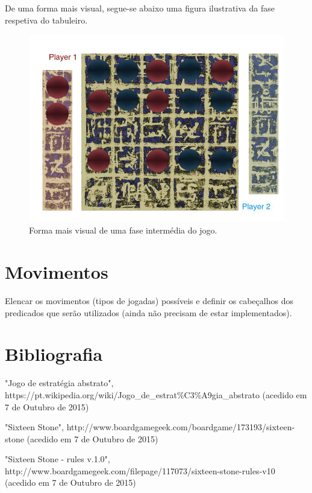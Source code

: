 \documentclass[a4paper]{article}
\begin{document}
De uma forma mais visual, segue-se abaixo uma figura ilustrativa da fase respetiva do tabuleiro.

\begin{figure}[!htb]
	\centering
	\includegraphics[scale=0.6]{images/board_inter.png}
	\caption{Forma mais visual de uma fase intermédia do jogo.}
\end{figure}

\newpage

\section{Movimentos}

Elencar os movimentos (tipos de jogadas) possíveis e definir os cabeçalhos dos predicados que serão utilizados (ainda não precisam de estar implementados).

\newpage

\section*{Bibliografia}

"Jogo de estratégia abstrato", https://pt.wikipedia.org/wiki/Jogo\_de\_estrat\%C3\%A9gia\_abstrato (acedido em 7 de Outubro de 2015) \newline

"Sixteen Stone", http://www.boardgamegeek.com/boardgame/173193/sixteen-stone (acedido em 7 de Outubro de 2015) \newline

"Sixteen Stone - rules v.1.0", http://www.boardgamegeek.com/filepage/117073/sixteen-stone-rules-v10 (acedido em 7 de Outubro de 2015) \newline
\end{document}
